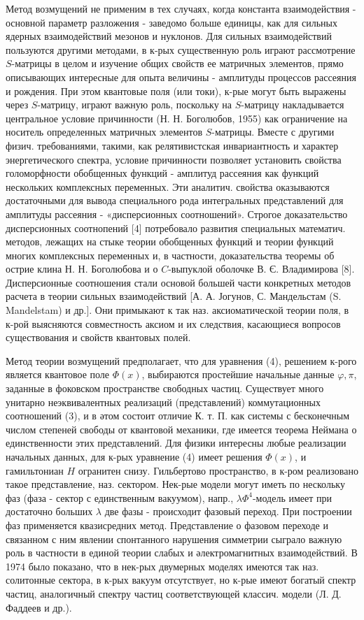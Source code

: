 \documentclass[10pt]{article}
\begin{document}
Метод возмущений не применим в тех случаях, когда константа взаимодействия - основной параметр разложения - заведомо больше единицы, как для сильных ядерных взаимодействий мезонов и нуклонов. Для сильных взаимодействий пользуются другими методами, в к-рых существенную роль играют рассмотрение $S$-матрицы в целом и изучение общих свойств ее матричных элементов, прямо описывающих интересные для опыта величины - амплитуды процессов рассеяния и рождения. При этом квантовые поля (или токи), к-рые могут быть выражены через $S$-матрицу, играют важную роль, поскольку на $S$-матрицу накладывается центральное условие причинности (Н. Н. Боголюбов, 1955) как ограничение на носитель определенных матричных элементов $S$-матрицы. Вместе с другими физич. требованиями, такими, как релятивистская инвариантность и характер энергетического спектра, условие причинности позволяет установить свойства голоморфности обобщенных функций - амплитуд рассеяния как функций нескольких комплексных переменных. Эти аналитич. свойства оказываются достаточными для вывода специального рода интегральных представлений для амплитуды рассеяния - «дисперсионных соотношений». Строгое доказательство дисперсионных соотнопений [4] потребовало развития специальных математич. методов, лежащих на стыке теории обобщенных функций и теории функций многих комплексных переменных и, в частности, доказательства теоремы об острие клина Н. Н. Боголюбова и о $C$-выпуклой оболочке В. Є. Владимирова [8]. Дисперсионные соотношения стали основой большей части конкретных методов расчета в теории сильных взаимодействий [А. А. Јогунов, С. Мандельстам (S. Mandelstam) и др.]. Они примыкают к так наз. аксиоматической теории поля, в к-рой выясняются совместность аксиом и их следствия, касающиеся вопросов существования и свойств квантовых полей.



Метод теории возмущений предполагает, что для уравнения (4), решением к-рого является квантовое поле $\Phi(x)$, выбираются простейшие начальные данные $\varphi, \pi$, заданные в фоковском пространстве свободных частиц. Существует много унитарно неэквивалентных реализаций (представлений) коммутационных соотношений (3), и в әтом состоит отличие К. т. П. как системы с бесконечным числом степеней свободы от квантовой механики, где имеется теорема Неймана о единственности этих представлений. Для физики интересны любые реализации начальных данных, для к-рых уравнение (4) имеет решения $\Phi(x)$, и гамильтониан $H$ огранитен снизу. Гильбертово пространство, в к-ром реализовано такое представление, наз. сектором. Нек-рые модели могут иметь по нескольку фаз (фаза - сектор с единственным вакуумом), напр., $\lambda \Phi^{4}$-модель имеет при достаточно больших $\lambda$ две фазы - происходит фазовый переход. При построении фаз применяется квазисредних метод. Представление о фазовом переходе и связанном с ним явлении спонтанного нарушения симметрии сыграло важную роль в частности в единой теории слабых и әлектромагнитных взаимодействий. В 1974 было показано, что в нек-рых двумерных моделях имеются так наз. солитонные сектора, в к-рых вакуум отсутствует, но к-рые имеют богатый спектр частиц, аналогичный спектру частиц соответствующей классич. модели (Л. Д. Фаддеев и др.).
\end{document}

